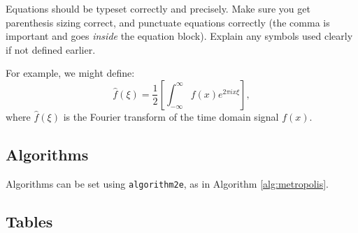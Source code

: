 \documentclass{l4proj}
\begin{document}
Equations should be typeset correctly and precisely. Make sure you get parenthesis sizing correct, and punctuate equations correctly 
(the comma is important and goes \textit{inside} the equation block). Explain any symbols used clearly if not defined earlier. 

For example, we might define:
\begin{equation}
    \hat{f}(\xi) = \frac{1}{2}\left[ \int_{-\infty}^{\infty} f(x) e^{2\pi i x \xi} \right],
\end{equation}    
where $\hat{f}(\xi)$ is the Fourier transform of the time domain signal $f(x)$.

\subsection{Algorithms}
Algorithms can be set using \texttt{algorithm2e}, as in Algorithm \ref{alg:metropolis}.

\begin{algorithm}
    \DontPrintSemicolon
    
\caption{The Metropolis-Hastings MCMC algorithm for drawing samples from arbitrary probability distributions, 
specialised for normal proposal distributions $q(x^\prime|x) = \mathcal{N}(x, \sigma^2)$. The symmetry of the normal distribution means the acceptance rule takes the simplified form.}\label{alg:metropolis}
\end{algorithm}

\subsection{Tables}
\end{document}
